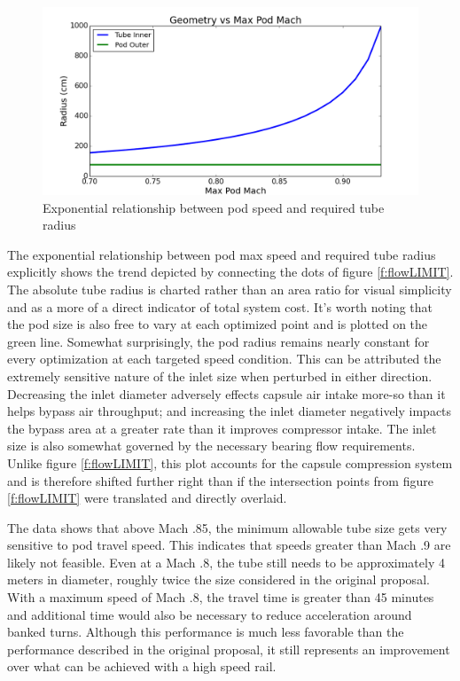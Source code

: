 \documentclass[heading.tex]{subfiles}
\begin{document}
\begin{figure}[hbtp]
\centering
\includegraphics[width=\textwidth]{images/mach_vs_rad2.png}
\caption{Exponential relationship between pod speed and required tube radius}
\label{f:machRAD}
\end{figure}

The exponential relationship between pod max speed and required tube radius explicitly shows the trend depicted by
connecting the dots of figure \ref{f:flowLIMIT}. The absolute tube radius is charted rather than an area ratio for visual simplicity
and as a more of a direct indicator of total system cost. It's worth noting that the pod size is also free to vary at each optimized point
and is plotted on the green line. Somewhat surprisingly, the pod radius remains
nearly constant for every optimization at each targeted speed condition. This can be attributed the extremely sensitive nature of the inlet
size when perturbed in either direction. Decreasing the inlet diameter adversely effects capsule air intake more-so than it helps
bypass air throughput; and increasing the inlet diameter negatively impacts the bypass area at a greater rate than it improves
compressor intake. The inlet size is also somewhat governed by the
necessary bearing flow requirements. Unlike figure \ref{f:flowLIMIT}, this plot accounts for
the capsule compression system and is therefore shifted further right than if the intersection points from figure \ref{f:flowLIMIT}
were translated and directly overlaid. 

The data shows that above Mach .85, the minimum allowable tube size gets very sensitive to pod travel speed. This indicates that speeds
greater than Mach .9 are likely not feasible. Even at a Mach .8, the tube still needs to be approximately 4 meters in diameter, roughly
twice the size considered in the original proposal. With a maximum speed of Mach .8, the travel time is greater than 45 minutes and
additional time would also be necessary to reduce acceleration around banked turns. Although this performance is much less favorable than the performance
described in the original proposal, it still represents an improvement over what can be achieved with a high speed rail.
\end{document}
